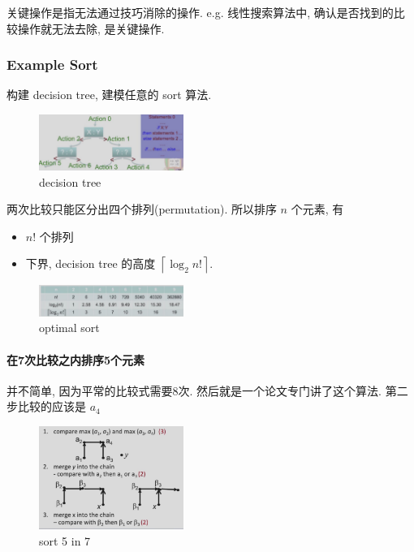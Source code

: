 关键操作是指无法通过技巧消除的操作. e.g. 线性搜索算法中, 确认是否找到的比较操作就无法去除, 是关键操作. 

\subsubsection{Example Sort}
构建 decision tree, 建模任意的 sort 算法. 

\begin{figure}[!htb]
    \centering
    \includegraphics[width=0.42\textwidth]{pic/DAA1/decision tree}
    \caption{decision tree}
\end{figure}

两次比较只能区分出四个排列(permutation). 所以排序 $n$ 个元素, 有
\begin{itemize}
    \item $n!$ 个排列
    \item 下界, decision tree 的高度 $\left\lceil \log_2 n! \right\rceil$. 
\end{itemize} 

\begin{figure}[!htb]
    \centering
    \includegraphics[width=0.42\textwidth]{pic/DAA1/optimal.png}
    \caption{optimal sort}
\end{figure}

\paragraph{在7次比较之内排序5个元素} 并不简单, 因为平常的比较式需要8次. 然后就是一个论文专门讲了这个算法. 第二步比较的应该是 $a_4$

\begin{figure}[!htb]
    \centering
    \includegraphics[width=0.42\textwidth]{pic/DAA1/sort5in7}
    \caption{sort 5 in 7}
\end{figure}


